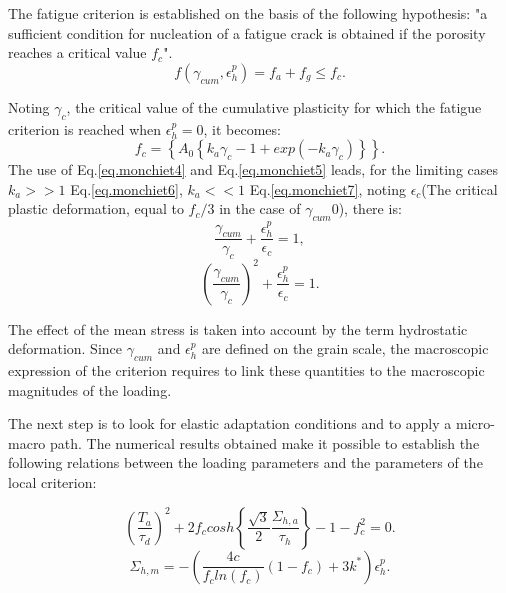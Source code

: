 \documentclass[3p,times,procedia,number]{elsarticle}
\begin{document}
	The fatigue criterion is established on the basis of the following hypothesis: "a sufficient condition for nucleation of a fatigue crack is obtained if the porosity reaches a critical value $f_c$".
	\begin{equation}
	f\left( \gamma_{cum},\epsilon_h^p\right) =f_a+f_g\leqslant f_c.
	\label{eq.monchiet4}
	\end{equation}

Noting $\gamma_c$, the critical value of the cumulative plasticity for which the fatigue criterion is reached when $\epsilon_h^p=0$, it becomes:
\begin{equation}
f_c=\left\lbrace A_0\left\lbrace k_a\gamma_{c}-1+exp\left(-k_a\gamma_{c} \right)  \right\rbrace \right\rbrace.
\label{eq.monchiet5}
\end{equation}
The use of Eq.\eqref{eq.monchiet4} and Eq.\eqref{eq.monchiet5} leads, for the limiting cases $k_a >> 1$ Eq.\eqref{eq.monchiet6}, $k_a << 1$ Eq.\eqref{eq.monchiet7}, noting $\epsilon_c$(The critical plastic deformation, equal to $f_c / 3$ in the case of $\gamma_{cum} 0$), there is:
\begin{equation}
\dfrac{\gamma_{cum}}{\gamma_{c}}+\dfrac{\epsilon_h^p}{\epsilon_c}=1,
\label{eq.monchiet6}
\end{equation}
\begin{equation}
\left( \dfrac{\gamma_{cum}}{\gamma_{c}}\right) ^2+\dfrac{\epsilon_h^p}{\epsilon_c}=1.
\label{eq.monchiet7}
\end{equation}

The effect of the mean stress is taken into account by the term hydrostatic deformation. Since $\gamma_{cum}$ and $\epsilon_h^p$ are defined on the grain scale, the macroscopic expression of the criterion requires to link these quantities to the macroscopic magnitudes of the loading.

The next step is to look for elastic adaptation conditions and to apply a micro-macro path. The numerical results obtained make it possible to establish the following relations between the loading parameters and the parameters of the local criterion:

\begin{equation}
\left( \dfrac{T_a}{\tau_d}\right) ^2+2f_ccosh\left\lbrace\dfrac{\sqrt{3}}{2}\dfrac{\Sigma_{h,a}}{\tau_h} \right\rbrace-1-f_c^2=0.
	\label{eq.monchiet8}
\end{equation}
\begin{equation}
\Sigma_{h,m}=-\left( \dfrac{4c}{f_cln(f_c)}\left( 1-f_c\right)+3k^{\ast} \right) \epsilon_h^p.
	\label{eq.monchiet9}
\end{equation}
\end{document}
